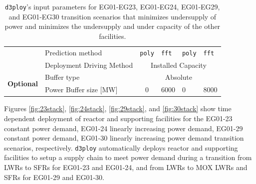 \documentclass[11pt]{article}
\newcommand{\deploy}{\texttt{d3ploy}\xspace}%
\begin{document}
\begin{table}[]
{\begin{tabular}{l|l|c|l|l|l}
											  & Prediction method                                              & \texttt{poly}       & \texttt{fft}             & \texttt{poly}         &  \texttt{fft}    \\ \cline{2-6} 
											  & Deployment Driving Method                                      & \multicolumn{4}{c}{Installed Capacity}                                                                                                                                                                                                                                                                    \\ \hline
	\multirow{2}{*}{\textbf{Optional}} & Buffer type                                                    & \multicolumn{4}{c}{Absolute}                                                                                                                                                                                                                                                               \\ \cline{2-6} 
											  & Power Buffer size [MW]                                                   & 0 & 6000 & 0 & 8000 \\ \hline
	\end{tabular}%
	}
	\caption{\deploy's input parameters for EG01-EG23, EG01-EG24, EG01-EG29, and 
	EG01-EG30 transition scenarios
	that minimizes undersupply of power and minimizes 
	the undersupply and under capacity of the other facilities. }
	\label{tab:bestinputs}
	\end{table}

Figures \ref{fig:23stack}, \ref{fig:24stack}, \ref{fig:29stack}, 
and \ref{fig:30stack} show
time dependent deployment of reactor and supporting facilities for 
the EG01-23 constant power demand, EG01-24 linearly increasing power demand, 
EG01-29 constant power demand, EG01-30 linearly increasing power demand
transition scenarios, respectively. 
\deploy automatically deploys reactor and supporting facilities 
to setup a supply chain to meet power demand
during a transition from \glspl{LWR} to \glspl{SFR} for EG01-23 and EG01-24, 
and from \glspl{LWR} to \gls{MOX} \glspl{LWR} and \glspl{SFR} for EG01-29 and
EG01-30. 
\end{document}
